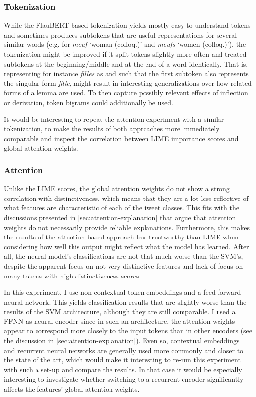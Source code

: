 \subsubsection{Tokenization}

While the FlauBERT-based tokenization yields mostly easy-to-understand tokens and sometimes produces subtokens that are useful representations for several similar words (e.g.  for \textit{meuf} `woman (colloq.)' and \textit{meufs} `women (colloq.)'), the tokenization might be improved if it split tokens slightly more often and treated subtokens at the beginning/middle and at the end of a word identically.
That is, representing for instance \textit{filles} as  and  such that the first subtoken also represents the singular form \textit{fille}, might result in interesting generalizations over how related forms of a lemma are used.
To then capture possibly relevant effects of inflection or derivation, token bigrams could additionally be used.

It would be interesting to repeat the attention experiment with a similar tokenization, to make the results of both approaches more immediately comparable and inspect the correlation between LIME importance scores and global attention weights.

\subsubsection{Attention}

Unlike the LIME scores, the global attention weights do not show a strong correlation with distinctiveness, which means that they are a lot less reflective of what features are characteristic of each of the tweet classes.
This fits with the discussions presented in \autoref{sec:attention-explanation} that argue that attention weights do not necessarily provide reliable explanations.
Furthermore, this makes the results of the attention-based approach less trustworthy than LIME when considering how well this output might reflect what the model has learned.
After all, the neural model's classifications are not that much worse than the SVM's, despite the apparent focus on not very distinctive features and lack of focus on many tokens with high distinctiveness scores. 

In this experiment, I use non-contextual token embeddings and a feed-forward neural network.
This yields classification results that are slightly worse than the results of the SVM architecture, although they are still comparable.
I used a FFNN as neural encoder since in such an architecture, the attention weights appear to correspond more closely to the input tokens than in other encoders (see the discussion in \autoref{sec:attention-explanation}).
Even so, contextual embeddings and recurrent neural networks are generally used more commonly and closer to the state of the art, which would make it interesting to re-run this experiment with such a set-up and compare the results.
In that case it would be especially interesting to investigate whether switching to a recurrent encoder significantly affects the features' global attention weights.


